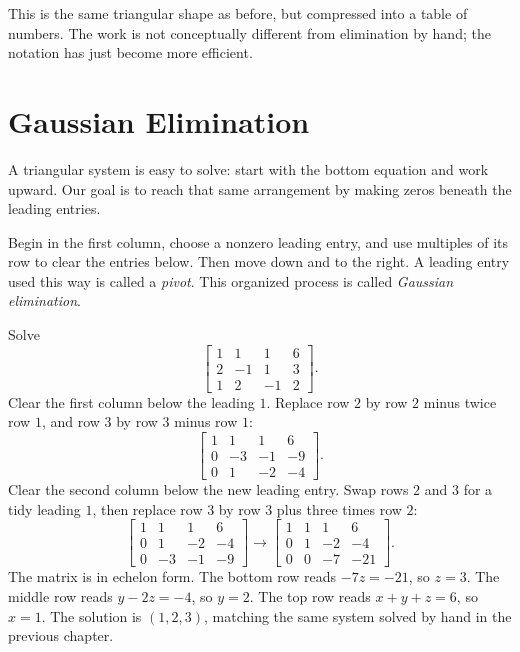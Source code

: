 \documentclass[12pt]{book}
\begin{document}
This is the same triangular shape as before, but compressed into a table of numbers.
The work is not conceptually different from elimination by hand; the notation has just
become more efficient.

\section{Gaussian Elimination}

A triangular system is easy to solve: start with the bottom
equation and work upward. Our goal is to reach that same
arrangement by making zeros beneath the leading entries.

Begin in the first column, choose a nonzero leading entry,
and use multiples of its row to clear the entries below.
Then move down and to the right. A leading entry used this
way is called a \emph{pivot}. This organized process is
called \emph{Gaussian elimination}.

\begin{example}
Solve
\[
\left[\begin{array}{ccc|c}
1&1&1&6\\ 2&-1&1&3\\ 1&2&-1&2
\end{array}\right].
\]
Clear the first column below the leading $1$. Replace row $2$ by row $2$ minus twice
row $1$, and row $3$ by row $3$ minus row $1$:
\[
\left[\begin{array}{ccc|c}
1&1&1&6\\ 0&-3&-1&-9\\ 0&1&-2&-4
\end{array}\right].
\]
Clear the second column below the new leading entry. Swap rows $2$ and $3$ for a
tidy leading $1$, then replace row $3$ by row $3$ plus three times row $2$:
\[
\left[\begin{array}{ccc|c}
1&1&1&6\\ 0&1&-2&-4\\ 0&-3&-1&-9
\end{array}\right]
\rightarrow
\left[\begin{array}{ccc|c}
1&1&1&6\\ 0&1&-2&-4\\ 0&0&-7&-21
\end{array}\right].
\]
The matrix is in echelon form. The bottom row reads $-7z=-21$, so $z=3$. The middle
row reads $y-2z=-4$, so $y=2$. The top row reads $x+y+z=6$, so $x=1$. The solution is
$(1,2,3)$, matching the same system solved by hand in the previous chapter.
\end{example}
\end{document}
